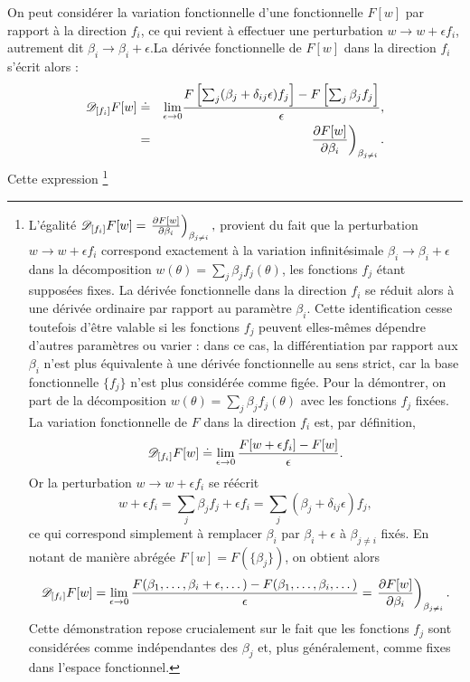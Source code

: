 On peut considérer la variation fonctionnelle d'une fonctionnelle $F[w]$ par rapport à la direction $f_i$, ce qui revient à effectuer une perturbation $w \rightarrow w + \epsilon f_i$, autrement dit $\beta_i \rightarrow \beta_i + \epsilon$.La dérivée fonctionnelle de $F[w]$ dans la direction $f_i$ s’écrit alors :
\begin{eqnarray}\label{chap4:eq.w_fi_dif}
	\mathscr{D}_{[f_i]} F[w]  &\doteq &  \underset{\epsilon \to 0 }{ \lim  } \frac{ F\left[\sum_j ( \beta_j + \delta_{ij} \epsilon) f_j \right]  - F \left[\sum_j  \beta_j f_j\right]}{\epsilon},\\
	& = & \left. \frac{ \partial F[w]}{ \partial \beta_i } \right)_{\beta_{j\neq i} }.
\end{eqnarray}
Cette expression 
\footnote{
L’égalité 
\(
\mathscr{D}_{[f_i]} F[w] = \left. \frac{ \partial F[w]}{ \partial \beta_i } \right)_{\beta_{j\neq i} },
\)
provient du fait que la perturbation $w \rightarrow w + \epsilon f_i$ correspond exactement à la variation infinitésimale $\beta_i \rightarrow \beta_i + \epsilon$ dans la décomposition $w(\theta)=\sum_j \beta_j f_j(\theta)$, les fonctions $f_j$ étant supposées fixes. La dérivée fonctionnelle dans la direction $f_i$ se réduit alors à une dérivée ordinaire par rapport au paramètre $\beta_i$. Cette identification cesse toutefois d’être valable si les fonctions $f_j$ peuvent elles-mêmes dépendre d’autres paramètres ou varier : dans ce cas, la différentiation par rapport aux $\beta_i$ n’est plus équivalente à une dérivée fonctionnelle au sens strict, car la base fonctionnelle $\{f_j\}$ n’est plus considérée comme figée.
Pour la démontrer, on part de la décomposition $w(\theta) = \sum_j \beta_j f_j(\theta)$ avec les fonctions $f_j$ fixées. La variation fonctionnelle de $F$ dans la direction $f_i$ est, par définition,
\[
\mathscr{D}_{[f_i]} F[w] 
\doteq \lim_{\epsilon \to 0} 
\frac{F[w + \epsilon f_i] - F[w]}{\epsilon}.
\]
Or la perturbation $w \to w + \epsilon f_i$ se réécrit
\[
w + \epsilon f_i 
= \sum_j \beta_j f_j + \epsilon f_i
= \sum_j (\beta_j + \delta_{ij}\epsilon) f_j,
\]
ce qui correspond simplement à remplacer $\beta_i$ par $\beta_i + \epsilon$ à $\beta_{j\neq i}$ fixés. En notant de manière abrégée $F[w] = F(\{\beta_j\})$, on obtient alors
\[
\mathscr{D}_{[f_i]} F[w] 
= \lim_{\epsilon \to 0} 
\frac{F(\beta_1,\dots,\beta_i + \epsilon,\dots) - F(\beta_1,\dots,\beta_i,\dots)}{\epsilon}
= \left. \frac{\partial F[w]}{\partial \beta_i} \right)_{\beta_{j\neq i}}.
\]
Cette démonstration repose crucialement sur le fait que les fonctions $f_j$ sont considérées comme indépendantes des $\beta_j$ et, plus généralement, comme fixes dans l’espace fonctionnel.}

